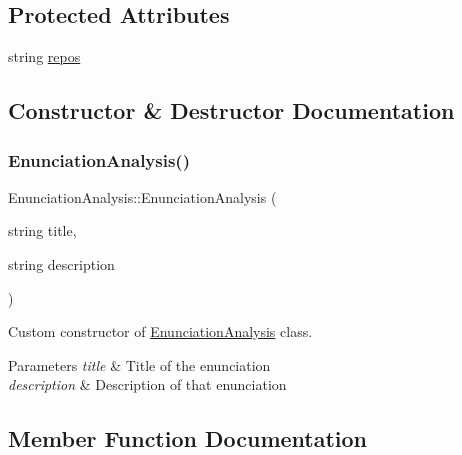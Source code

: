\subsection*{Protected Attributes}
\begin{DoxyCompactItemize}
\item 
string \hyperlink{class_enunciation_analysis_a3ceb48cf1cfe6594b853b52c9ce9aae4}{repos}
\end{DoxyCompactItemize}


\subsection{Constructor \& Destructor Documentation}
\mbox{\label{class_enunciation_analysis_a1a6a72d187591dd38fbf92a37fee22dc}} 
\subsubsection{\texorpdfstring{Enunciation\+Analysis()}{EnunciationAnalysis()}}
{\footnotesize\ttfamily Enunciation\+Analysis\+::\+Enunciation\+Analysis (\begin{DoxyParamCaption}\item[{string}]{title,  }\item[{string}]{description }\end{DoxyParamCaption})}



Custom constructor of \hyperlink{class_enunciation_analysis}{Enunciation\+Analysis} class. 


\begin{DoxyParams}{Parameters}
{\em title} & Title of the enunciation \\
\hline
{\em description} & Description of that enunciation \\
\hline
\end{DoxyParams}


\subsection{Member Function Documentation}
\mbox{\label{class_enunciation_analysis_a19fa90c811af4addfe77c4109520a8e1}} 
